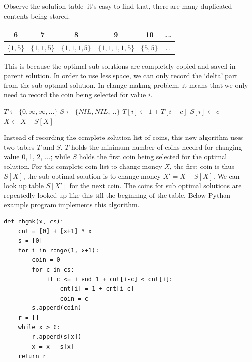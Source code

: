 \documentclass[UTF8]{article}
\begin{document}
Observe the solution table, it's easy to find that, there are many duplicated
contents being stored.

\begin{tabular}{|c|c|c|c|c|c|}
\hline
6 & 7 & 8 & 9 & 10 & ... \\
\hline
$\{ 1, 5 \}$ & $\{1, 1, 5\}$ & $\{1, 1, 1, 5\}$ & $\{1, 1, 1, 1, 5\}$ & $\{ 5, 5 \}$ & ... \\
\hline
\end{tabular}

This is because the optimal sub solutions are
completely copied and saved in parent solution.
In order to use less space, we can only record the `delta' part
from the sub optimal solution. In change-making problem, it means that
we only need to record the coin being selected for value $i$.

\begin{algorithmic}[1]
  \State $T \gets \{ 0, \infty, \infty, ... \}$
  \State $S \gets \{ NIL, NIL, ... \}$
        \State $T[i] \gets 1 + T[i-c]$
        \State $S[i] \gets c$
      \EndIf
    \EndFor
  \EndFor
    \State {}
    \State $X \gets X - S[X]$
  \EndWhile
\EndFunction
\end{algorithmic}

Instead of recording the complete solution list of coins, this new algorithm
uses two tables $T$ and $S$. $T$ holds the minimum number of coins needed for
changing value 0, 1, 2, ...; while $S$ holds the first coin being selected
for the optimal solution. For the complete coin list to change
money $X$, the first coin is thus $S[X]$, the sub optimal solution is
to change money $X' = X-S[X]$. We can look up table $S[X']$ for the
next coin. The coins for sub optimal solutions are repeatedly looked
up like this till the beginning of the table. Below Python example program
implements this algorithm.

\lstset{language=Python}
\begin{lstlisting}
def chgmk(x, cs):
    cnt = [0] + [x+1] * x
    s = [0]
    for i in range(1, x+1):
        coin = 0
        for c in cs:
            if c <= i and 1 + cnt[i-c] < cnt[i]:
                cnt[i] = 1 + cnt[i-c]
                coin = c
        s.append(coin)
    r = []
    while x > 0:
        r.append(s[x])
        x = x - s[x]
    return r
\end{lstlisting}
\end{document}
